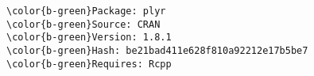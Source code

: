 \documentclass[class=minimal,border=0]{standalone}
\begin{document}
%
\begin{BVerbatim}[bgcolor=b-darkgrey]
\color{b-green}Package: plyr
\color{b-green}Source: CRAN
\color{b-green}Version: 1.8.1
\color{b-green}Hash: be21bad411e628f810a92212e17b5be7
\color{b-green}Requires: Rcpp
\end{BVerbatim}
\end{document}
